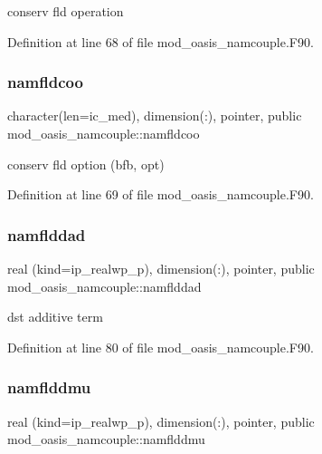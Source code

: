 conserv fld operation 



Definition at line 68 of file mod\+\_\+oasis\+\_\+namcouple.\+F90.

\mbox{\label{namespacemod__oasis__namcouple_a119b86702766d5392cb44856448bcd3e}} 
\subsubsection{\texorpdfstring{namfldcoo}{namfldcoo}}
{\footnotesize\ttfamily character(len=ic\+\_\+med), dimension(\+:), pointer, public mod\+\_\+oasis\+\_\+namcouple\+::namfldcoo}



conserv fld option (bfb, opt) 



Definition at line 69 of file mod\+\_\+oasis\+\_\+namcouple.\+F90.

\mbox{\label{namespacemod__oasis__namcouple_af1e31f45ea1cd7a7b64a8a7dc2cec4ee}} 
\subsubsection{\texorpdfstring{namflddad}{namflddad}}
{\footnotesize\ttfamily real (kind=ip\+\_\+realwp\+\_\+p), dimension(\+:), pointer, public mod\+\_\+oasis\+\_\+namcouple\+::namflddad}



dst additive term 



Definition at line 80 of file mod\+\_\+oasis\+\_\+namcouple.\+F90.

\mbox{\label{namespacemod__oasis__namcouple_ad81bb4f19a71f0fcf8655cb9d39a3380}} 
\subsubsection{\texorpdfstring{namflddmu}{namflddmu}}
{\footnotesize\ttfamily real (kind=ip\+\_\+realwp\+\_\+p), dimension(\+:), pointer, public mod\+\_\+oasis\+\_\+namcouple\+::namflddmu}



